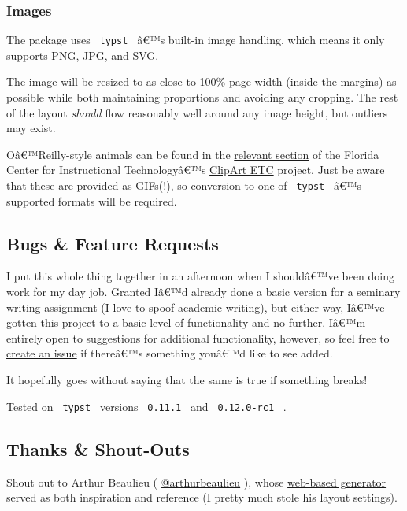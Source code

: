 \subsubsection{Images}\label{images}

The package uses \texttt{\ typst\ } â€™s built-in image handling, which
means it only supports PNG, JPG, and SVG.

The image will be resized to as close to 100\% page width (inside the
margins) as possible while both maintaining proportions and avoiding any
cropping. The rest of the layout \emph{should} flow reasonably well
around any image height, but outliers may exist.

Oâ€™Reilly-style animals can be found in the
\href{https://etc.usf.edu/clipart/galleries/730-animals}{relevant
section} of the Florida Center for Instructional Technologyâ€™s
\href{https://etc.usf.edu/clipart/}{ClipArt ETC} project. Just be aware
that these are provided as GIFs(!), so conversion to one of
\texttt{\ typst\ } â€™s supported formats will be required.

\subsection{Bugs \& Feature Requests}\label{bugs-feature-requests}

I put this whole thing together in an afternoon when I shouldâ€™ve been
doing work for my day job. Granted Iâ€™d already done a basic version
for a seminary writing assignment (I love to spoof academic writing),
but either way, Iâ€™ve gotten this project to a basic level of
functionality and no further. Iâ€™m entirely open to suggestions for
additional functionality, however, so feel free to
\href{https://github.com/dei-layborer/o-rly-typst/issues}{create an
issue} if thereâ€™s something youâ€™d like to see added.

It hopefully goes without saying that the same is true if something
breaks!

Tested on \texttt{\ typst\ } versions \texttt{\ 0.11.1\ } and
\texttt{\ 0.12.0-rc1\ } .

\subsection{Thanks \& Shout-Outs}\label{thanks-shout-outs}

Shout out to Arthur Beaulieu (
\href{https://github.com/ArthurBeaulieu}{@arthurbeaulieu} ), whose
\href{https://arthurbeaulieu.github.io/ORlyGenerator/}{web-based
generator} served as both inspiration and reference (I pretty much stole
his layout settings).

